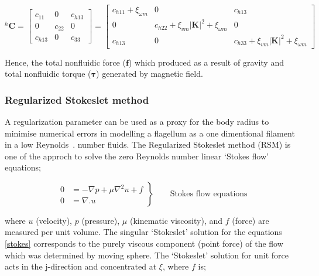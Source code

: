 \documentclass[12pt,a4paper,titlepage]{report}
\begin{document}
\begin{equation}
 ^{h}\bm{C} = \begin{bmatrix}
       c_{11}  & 0 		 & c_{h13}            \\[0.3em]
       0		 & c_{22}           & 0\\[0.3em]
       c_{h13}            	& 0 		& c_{33} 
     \end{bmatrix}
	=
	 \begin{bmatrix}
       c_{h11}+ \xi_{\omega m} & 0 		 & c_{h13}            \\[0.3em]
       0		 & c_{h22}+  \xi_{vm}|\bm{K}|^2 +\xi_{\omega m}          & 0\\[0.3em]
       c_{h13}            	& 0 		& c_{h33} + \xi_{vm}|\bm{K}|^2 +\xi_{\omega m}
     \end{bmatrix}
\label{C_Finalmatrix}
\end{equation}

Hence, the total nonfluidic force ($\bm{f}$) which produced as a result of gravity and total nonfluidic torque
($\bm{\tau}$) generated by magnetic field.





\subsubsection{Regularized Stokeslet method}\label{method2}

A regularization parameter can be used as a proxy for the body radius to minimise numerical errors
 in modelling a flagellum as a one dimentional filament in a low Reynolds~\citep{smith2009boundary}.
number fluids. The Regularized Stokeslet method (RSM) is one of the approch to solve the zero 
Reynolds number linear \lq{}Stokes flow\rq{} equations;



\begin{equation}
 \left.\begin{aligned}
        0 &= - \nabla p + \mu \nabla ^ 2 u + f \\
        0 &=\nabla . u
       \end{aligned}
 \right\}
 \qquad \text{Stokes flow equations}
\label{stokes}
\end{equation}

where $u$ (velocity), $p$ (pressure), $\mu $ (kinematic viscosity), and $f$ (force) are measured per unit
volume. The singular \lq{}Stokeslet\rq{} solution for the equations \ref{stokes} corresponds to the purely 
viscous component (point force) of the flow which was determined by moving sphere. 
The \lq{}Stokeslet\rq{} solution for unit force acts in the j-direction and concentrated at $\xi $, where $f$ is;
  
\end{document}
